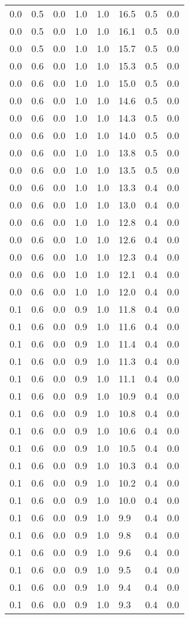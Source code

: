 \begin{tabular}{L{1in}|L{1in}|L{1in}|L{1in}|L{1in}|L{1in}|L{1in}|L{1in}}
0.0&0.5&0.0&1.0&1.0&16.5&0.5&0.0\\
0.0&0.5&0.0&1.0&1.0&16.1&0.5&0.0\\
0.0&0.5&0.0&1.0&1.0&15.7&0.5&0.0\\
0.0&0.6&0.0&1.0&1.0&15.3&0.5&0.0\\
0.0&0.6&0.0&1.0&1.0&15.0&0.5&0.0\\
0.0&0.6&0.0&1.0&1.0&14.6&0.5&0.0\\
0.0&0.6&0.0&1.0&1.0&14.3&0.5&0.0\\
0.0&0.6&0.0&1.0&1.0&14.0&0.5&0.0\\
0.0&0.6&0.0&1.0&1.0&13.8&0.5&0.0\\
0.0&0.6&0.0&1.0&1.0&13.5&0.5&0.0\\
0.0&0.6&0.0&1.0&1.0&13.3&0.4&0.0\\
0.0&0.6&0.0&1.0&1.0&13.0&0.4&0.0\\
0.0&0.6&0.0&1.0&1.0&12.8&0.4&0.0\\
0.0&0.6&0.0&1.0&1.0&12.6&0.4&0.0\\
0.0&0.6&0.0&1.0&1.0&12.3&0.4&0.0\\
0.0&0.6&0.0&1.0&1.0&12.1&0.4&0.0\\
0.0&0.6&0.0&1.0&1.0&12.0&0.4&0.0\\
0.1&0.6&0.0&0.9&1.0&11.8&0.4&0.0\\
0.1&0.6&0.0&0.9&1.0&11.6&0.4&0.0\\
0.1&0.6&0.0&0.9&1.0&11.4&0.4&0.0\\
0.1&0.6&0.0&0.9&1.0&11.3&0.4&0.0\\
0.1&0.6&0.0&0.9&1.0&11.1&0.4&0.0\\
0.1&0.6&0.0&0.9&1.0&10.9&0.4&0.0\\
0.1&0.6&0.0&0.9&1.0&10.8&0.4&0.0\\
0.1&0.6&0.0&0.9&1.0&10.6&0.4&0.0\\
0.1&0.6&0.0&0.9&1.0&10.5&0.4&0.0\\
0.1&0.6&0.0&0.9&1.0&10.3&0.4&0.0\\
0.1&0.6&0.0&0.9&1.0&10.2&0.4&0.0\\
0.1&0.6&0.0&0.9&1.0&10.0&0.4&0.0\\
0.1&0.6&0.0&0.9&1.0&9.9&0.4&0.0\\
0.1&0.6&0.0&0.9&1.0&9.8&0.4&0.0\\
0.1&0.6&0.0&0.9&1.0&9.6&0.4&0.0\\
0.1&0.6&0.0&0.9&1.0&9.5&0.4&0.0\\
0.1&0.6&0.0&0.9&1.0&9.4&0.4&0.0\\
0.1&0.6&0.0&0.9&1.0&9.3&0.4&0.0\\

\end{tabular}
